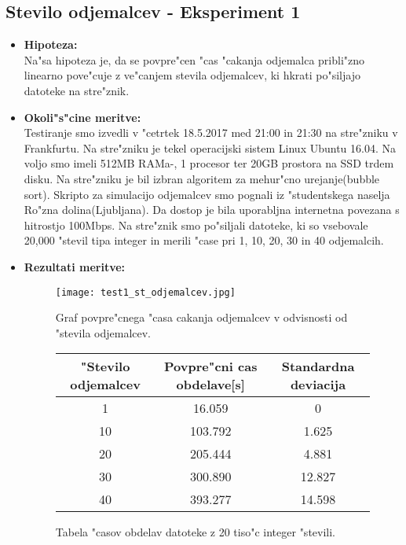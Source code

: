 \subsection{Stevilo odjemalcev - Eksperiment 1}
\begin{itemize}
	\item \textbf{Hipoteza: }  \\
		Na"sa hipoteza je, da se povpre"cen "cas "cakanja odjemalca pribli"zno linearno pove"cuje z ve"canjem stevila odjemalcev, ki hkrati po"siljajo datoteke na stre"znik.
			
	\item \textbf{Okoli"s"cine meritve: } \\
		Testiranje smo izvedli v "cetrtek 18.5.2017 med 21:00 in 21:30 na stre"zniku v Frankfurtu. Na stre"zniku je tekel operacijski sistem Linux Ubuntu 16.04. Na voljo smo imeli 512MB RAMa-, 1 procesor ter 20GB prostora na SSD trdem disku. Na stre"zniku je bil izbran algoritem za mehur"cno urejanje(bubble sort). Skripto za simulacijo odjemalcev smo pognali iz "studentskega naselja Ro"zna dolina(Ljubljana). Da dostop je bila uporabljna internetna povezana s hitrostjo 100Mbps. 
		Na stre"znik smo po"siljali datoteke, ki so vsebovale 20,000 "stevil tipa integer in merili "case pri 1, 10, 20, 30 in 40 odjemalcih.

 	\item \textbf{Rezultati meritve: }  \\
		
	\begin{figure}[!htb]
  	\centering
  	  \texttt{[image: test1\_st\_odjemalcev.jpg]}
  	\caption{Graf povpre"cnega "casa cakanja odjemalcev v odvisnosti od "stevila odjemalcev.}
  	\label{8_graf_st_odjemalcev}
	\end{figure}

	\begin{figure}[!htbp]
  	\centering
  	\begin{tabular}{ | c | c | c | }
    	\hline
    	"Stevilo odjemalcev & Povpre"cni cas obdelave[s] & Standardna deviacija\\ \hline
    	1 & 16.059     & 0 \\ \hline
    	10 & 103.792 & 1.625\\ \hline
    	20 & 205.444 & 4.881\\ \hline
    	30 & 300.890 & 12.827\\ \hline
    	40 & 393.277 & 14.598\\ \hline
  	\end{tabular}
  	\caption{Tabela "casov obdelav datoteke z 20 tiso"c integer "stevili.}
  	\label{8_table1}
  	\centering
	\end{figure}


\end{itemize}
